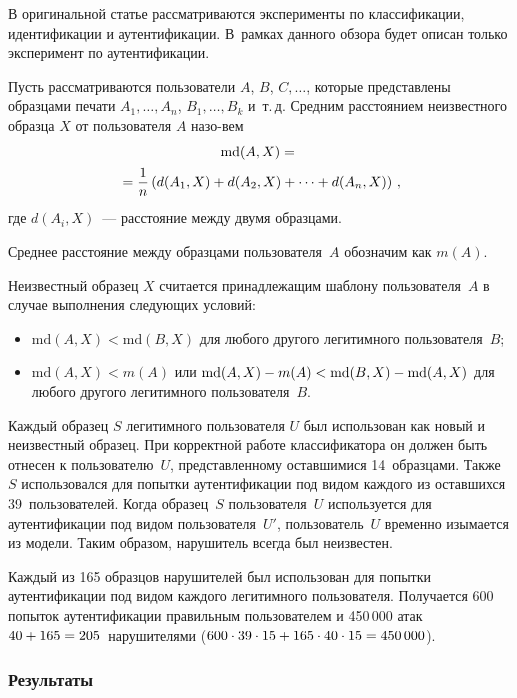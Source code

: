 \begin{multicols}{2}
В оригинальной статье рассматриваются эксперименты по классификации,
идентификации и аутентификации. В~рамках данного обзора будет описан
только эксперимент по аутентификации.


Пусть рассматриваются пользователи $A$, $B$, $C, \ldots$, которые
представлены образцами печати $A_1, \ldots, A_n$, $B_1, \ldots, B_k$
и~т.\,д. Средним расстоянием неизвестного образца $X$ от пользователя
$A$ назо-\linebreak вем
\begin{multline*}
\mathrm{md}(A, X) ={}\\
{}= \displaystyle\frac{\displaystyle 1\mathstrut}{\displaystyle n\mathstrut} \left(d(A_1, X) + d(A_2, X) + \cdots + d(A_n, X)\right)\,,
\end{multline*}
где $d(A_i, X)$~--- расстояние между двумя образцами.

Среднее расстояние между образцами пользователя~$A$ обозначим как $m(A)$.

Неизвестный образец $X$ считается принадлежащим 
шаблону пользователя~$A$ в случае выполнения следующих условий:
\begin{itemize}
    \item $\mathrm{md}(A,X) < \mathrm{md}(B,X)$ для любого другого легитимного пользователя~$B$;
    \item $\mathrm{md}(A,X) < m(A)$ {или} $\mathrm{md}(A,X) \hm- m(A) \hm< 
    \mathrm{md}(B,X) \hm- \mathrm{md}(A,X)$ 
    для любого другого легитимного пользователя~$B$.
\end{itemize}

Каждый образец $S$ легитимного пользователя $U$ был использован как
новый и неизвестный образец. При корректной работе классификатора он
должен быть отнесен к пользователю~$U$, представленному оставшимися
14~образцами. Также $S$ использовался для попытки аутентификации под
видом каждого из оставшихся 39~пользователей. Когда образец~$S$
пользователя~$U$ используется для аутентификации под видом
пользователя~$U'$, пользователь~$U$ временно изымается из модели.
Таким образом, нарушитель всегда был неизвестен.

Каждый из 165 образцов нарушителей был использован для попытки
аутентификации под видом каждого легитимного пользователя.
Получается 600 попыток аутентификации правильным пользователем и
450\,000 атак $40 \hm+ 165 \hm= 205$~нарушителями ($600 \cdot 39 \cdot 15 \hm+
165 \cdot 40 \cdot 15 \hm= 450\,000$).

\subsubsection {Результаты}


\end{multicols}
